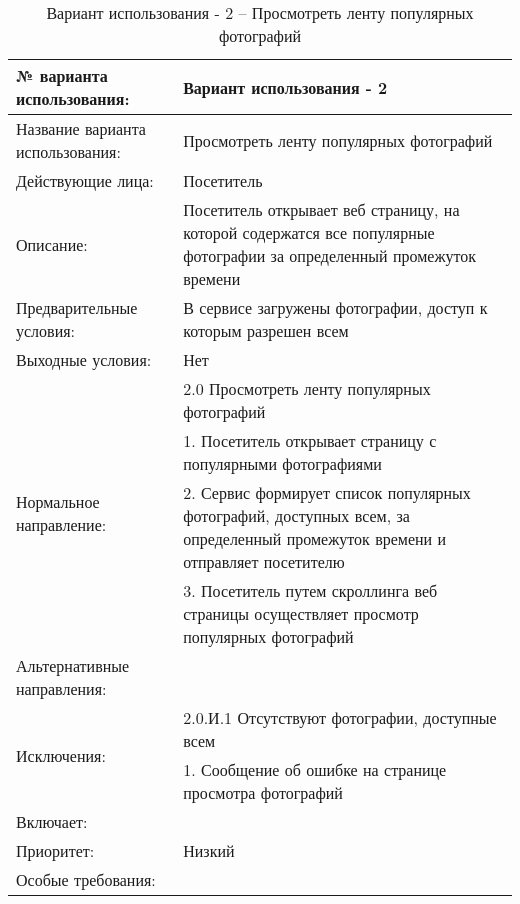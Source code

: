 \begin{table}[H]
  \caption{\onehalfspacing Вариант использования - 2 – Просмотреть ленту популярных фотографий}\label{use-case-2-table}
  \begin{tabular}{|p{6cm}|p{10cm}|}
  \hline № варианта использования: & Вариант использования - 2 \\
  \hline Название варианта использования: & Просмотреть ленту популярных фотографий \\
  \hline Действующие лица: & Посетитель \\
  \hline Описание: & Посетитель открывает веб страницу, на которой содержатся все популярные фотографии за определенный промежуток времени \\
  \hline Предварительные условия: & В сервисе загружены фотографии, доступ к которым разрешен всем \\
  \hline Выходные условия: & Нет \\
  \hline \multirow{4}{*}{Нормальное направление:} & 2.0 Просмотреть ленту популярных фотографий \\
  \cline{2-2} & 1. Посетитель открывает страницу с популярными фотографиями \\
  \cline{2-2} & 2. Сервис формирует список популярных фотографий, доступных всем, за определенный промежуток времени и отправляет посетителю \\
  \cline{2-2} & 3. Посетитель путем скроллинга веб страницы осуществляет просмотр популярных фотографий \\
  \hline Альтернативные направления: &  \\
  \hline \multirow{2}{*}{Исключения:} & 2.0.И.1 Отсутствуют фотографии, доступные всем \\
  \cline{2-2} & 1. Сообщение об ошибке на странице просмотра фотографий \\
  \hline Включает: &  \\
  \hline Приоритет: & Низкий \\
  \hline Особые требования: & \\
  \hline
  \end{tabular}
\end{table}


